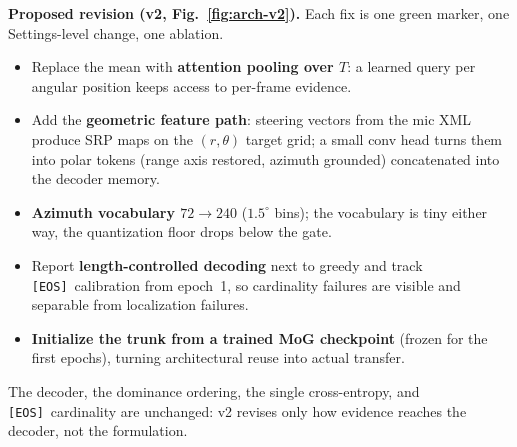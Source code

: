 \documentclass[10pt]{article}
\newcommand{\eos}{\texttt{[EOS]}}
\DeclareRobustCommand{\fixmk}[1]{\tikz[baseline=-0.62ex]{\node[circle,draw=green!45!black,
  fill=green!14,text=green!45!black,inner sep=0.8pt,font=\tiny\bfseries]{#1};}}
\begin{document}
\textbf{Proposed revision (v2, Fig.~\ref{fig:arch-v2}).} Each fix is one green
marker, one Settings-level change, one ablation.
\begin{itemize}
\item \fixmk{1} Replace the mean with \textbf{attention pooling over $T$}: a
learned query per angular position keeps access to per-frame evidence.
\item \fixmk{2} Add the \textbf{geometric feature path}: steering vectors from the
mic XML produce SRP maps on the $(r,\theta)$ target grid; a small conv head turns
them into polar tokens (range axis restored, azimuth grounded) concatenated into
the decoder memory.
\item \fixmk{3} \textbf{Azimuth vocabulary $72\!\to\!240$} ($1.5^\circ$ bins); the
vocabulary is tiny either way, the quantization floor drops below the gate.
\item \fixmk{4} Report \textbf{length-controlled decoding} next to greedy and track
\eos\ calibration from epoch~1, so cardinality failures are visible and separable
from localization failures.
\item \fixmk{5} \textbf{Initialize the trunk from a trained MoG checkpoint}
(frozen for the first epochs), turning architectural reuse into actual transfer.
\end{itemize}
The decoder, the dominance ordering, the single cross-entropy, and \eos\
cardinality are unchanged: v2 revises only how evidence reaches the decoder, not
the formulation.
\end{document}
